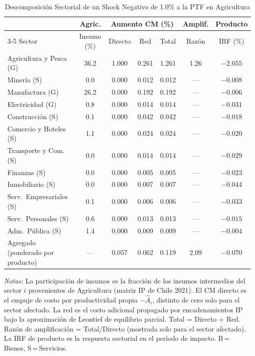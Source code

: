 \begin{table}[htbp]
\centering
\caption{Descomposición Sectorial de un Shock Negativo de 1.0\% a la PTF en Agricultura}
\label{tab:agr_decomp}
\begin{threeparttable}
\small
\begin{tabular}{@{}l c c c c c c@{}}
\toprule
 & Agric. & \multicolumn{3}{c}{Aumento CM (\%)} & Amplif. & Producto \\
\cmidrule(lr){3-5}
Sector & Insumo (\%) & Directo & Red & Total & Razón & IRF (\%) \\
\midrule
Agricultura y Pesca (G) & 36.2 & 1.000 & 0.261 & 1.261 &  1.26 & $-2.055$ \\
Minería (S) &  0.0 & 0.000 & 0.012 & 0.012 & --- & $-0.008$ \\
Manufactura (G) & 26.2 & 0.000 & 0.192 & 0.192 & --- & $-0.006$ \\
Electricidad (G) &  0.8 & 0.000 & 0.014 & 0.014 & --- & $-0.031$ \\
Construcción (S) &  0.1 & 0.000 & 0.042 & 0.042 & --- & $-0.018$ \\
Comercio y Hoteles (S) &  1.1 & 0.000 & 0.024 & 0.024 & --- & $-0.020$ \\
Transporte y Com. (S) &  0.0 & 0.000 & 0.014 & 0.014 & --- & $-0.029$ \\
Finanzas (S) &  0.0 & 0.000 & 0.005 & 0.005 & --- & $-0.023$ \\
Inmobiliario (S) &  0.0 & 0.000 & 0.007 & 0.007 & --- & $-0.044$ \\
Serv.\ Empresariales (S) &  0.1 & 0.000 & 0.006 & 0.006 & --- & $-0.033$ \\
Serv.\ Personales (S) &  0.6 & 0.000 & 0.013 & 0.013 & --- & $-0.015$ \\
Adm.\ Pública (S) &  1.4 & 0.000 & 0.009 & 0.009 & --- & $-0.004$ \\
\midrule
Agregado (ponderado por producto) & --- & 0.057 & 0.062 & 0.119 &  2.09 & $-0.070$ \\
\bottomrule
\end{tabular}
\begin{tablenotes}[flushleft]
\footnotesize
\item \textit{Notas:} La participación de insumos es la fracción de los insumos intermedios del sector $i$ provenientes de Agricultura (matriz IP de Chile 2021). El CM directo es el empuje de costo por productividad propia $-\hat A_i$, distinto de cero solo para el sector afectado. La red es el costo adicional propagado por encadenamientos IP bajo la aproximación de Leontief de equilibrio parcial. Total = Directo + Red. Razón de amplificación = Total/Directo (mostrada solo para el sector afectado). La IRF de producto es la respuesta sectorial en el período de impacto. B\,=\,Bienes, S\,=\,Servicios.
\end{tablenotes}
\end{threeparttable}
\end{table}
